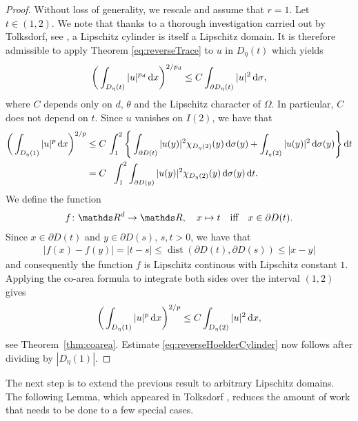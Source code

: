 \begin{proof}
  Without loss of generality, we rescale and assume that $r = 1$.
  Let $t \in (1,2)$. 
  We note that thanks to a thorough investigation carried out by Tolksdorf, see \cite[Lemma 1.3.25]{tolksdorf}, a Lipschitz cylinder is itself a Lipschitz domain.
  It is therefore admissible to apply Theorem \ref{eq:reverseTrace} to $u$ in $D_\eta(t)$ which yields
  \begin{align*}
    \bigg( \int_{D_\eta(t)} |u|^{p_d} \, {\operatorname{d}\!{x}} \bigg)^{2/p_d} \leq C \int_{\partial D_\eta(t)} |u|^2 \, {\operatorname{d}\!{\sigma}},
  \end{align*}
  where $C$ depends only on $d$, $\theta$ and the Lipschitz character of $\Omega$. In particular, $C$ does not depend on $t$.
  Since $u$ vanishes on $I(2)$, we have that
  \begin{align*}
    \bigg( \int_{D_\eta(1)} |u|^p \d x \bigg)^{2/p} 
    &\leq C\, \int_1^2 \Bigg\{  \int_{\partial D(t)} |u(y)|^2 \chi_{D_\eta(2)}(y) \d\sigma(y) +  \int_{I_\eta(2)} |u(y)|^2 \d \sigma(y) \Bigg\} \d t  \\
    &= C \hphantom{\Big\{} \int_1^2 \int_{\partial D(y)} |u(y)|^2 \chi_{D_\eta(2)}(y) \d\sigma(y) \d t.
  \end{align*}
  We define the function
  \begin{align*}
    f \colon \R^d \to \R, \quad x \mapsto t \quad\text{iff}\quad x \in \partial D(t).
  \end{align*}
  Since $x \in \partial D(t)$ and $y \in \partial D(s)$, $s,t > 0$, we have that
  \begin{align*}
    |f(x) - f(y)| = |t - s| \leq \operatorname{dist}(\partial D(t), \partial D(s)) \leq |x- y|
  \end{align*}
  and consequently the function $f$ is Lipschitz continous with Lipschitz constant $1$.
  Applying the co-area formula to integrate both sides over the interval $(1,2)$ gives
  \begin{align*}
    \bigg( \int_{D_\eta(1)} |u|^p \, {\operatorname{d}\!{x}} \bigg)^{2/p} \leq C \int_{D_\eta(2)} |u|^2 \, {\operatorname{d}\!{x}},
  \end{align*}
  see Theorem~\ref{thm:coarea}.
  Estimate \eqref{eq:reverseHoelderCylinder} now follows after dividing by $|D_\eta(1)|$.
\end{proof}

The next step is to extend the previous result to arbitrary Lipschitz domains. 
The following Lemma, which appeared in Tolksdorf \cite[Lem. 4.2]{tolksdorf2017}, reduces the amount of work that needs to be done to a few special cases.

